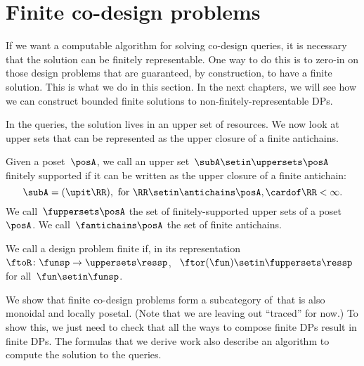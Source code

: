 \section{Finite co-design problems}

If we want a computable algorithm for solving co-design queries, it is necessary that the solution can be finitely representable.
One way to do this is to zero-in on those design problems that are guaranteed, by construction, to have a finite solution.
This is what we do in this section.
In the next chapters, we will see how we can construct bounded finite solutions to non-finitely-representable DPs.

In the \FixFunMinRes queries, the solution lives in an upper set of resources.
We now look at upper sets that can be represented as the upper closure of a finite antichains.

\begin{definition}
    \label{def:fuppersets}
    Given a poset~$\posA$, we call an upper set~$\subA \setin \uppersets \posA$ finitely supported
    if it can be written as the upper closure of a finite antichain:
    \begin{equation}
        \subA = (\upit\RR), \text{ for } \RR \setin \antichains \posA, \cardof\RR < \infty.
    \end{equation}
    We call~$\fuppersets \posA$ the set of finitely-supported upper sets of a poset~$\posA$.
    We call~$\fantichains \posA$ the set of finite antichains.
\end{definition}

\begin{definition}
    \label{def:finite_des_prob}
    We call a design problem finite if, in its representation~$\ftoR \colon \funsp \to \uppersets \ressp$,
    ~$\ftor(\fun) \setin \fuppersets\ressp$ for all~$\fun\setin\funsp$.
\end{definition}

We show that finite co-design problems form a subcategory of~\DP that is also monoidal and locally posetal.
(Note that we are leaving out ``traced'' for now.) To show this, we just need to check that all the ways to compose finite DPs result in finite DPs.
The formulas that we derive work also describe an algorithm to compute the solution to the queries.

